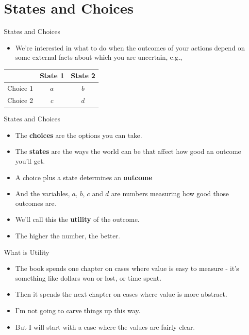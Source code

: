\documentclass[
  ignorenonframetext,
]{beamer}
\providecommand{\tightlist}{%
  \setlength{\itemsep}{0pt}\setlength{\parskip}{0pt}}
\renewcommand{\,}{\text{, }}
\begin{document}
\hypertarget{states-and-choices}{%
\section{States and Choices}\label{states-and-choices}}

\begin{frame}{States and Choices}
\protect\hypertarget{states-and-choices-1}{}

\begin{itemize}
\tightlist
\item
  We're interested in what to do when the outcomes of your actions
  depend on some external facts about which you are uncertain, e.g.,
\end{itemize}

\begin{longtable}[]{@{}rcc@{}}
\toprule
& State 1 & State 2\tabularnewline
\midrule
\endhead
Choice 1 & \(a\) & \(b\)\tabularnewline
Choice 2 & \(c\) & \(d\)\tabularnewline
\bottomrule
\end{longtable}

\end{frame}

\begin{frame}{States and Choices}
\protect\hypertarget{states-and-choices-2}{}

\begin{itemize}
\tightlist
\item
  The \textbf{choices} are the options you can take.
\item
  The \textbf{states} are the ways the world can be that affect how good
  an outcome you'll get.
\item
  A choice plus a state determines an \textbf{outcome}
\item
  And the variables, \(a\), \(b\), \(c\) and \(d\) are numbers measuring
  how good those outcomes are.
\item
  We'll call this the \textbf{utility} of the outcome.
\item
  The higher the number, the better.
\end{itemize}

\end{frame}

\begin{frame}{What is Utility}
\protect\hypertarget{what-is-utility}{}

\begin{itemize}
\tightlist
\item
  The book spends one chapter on cases where value is easy to measure -
  it's something like dollars won or lost, or time spent.
\item
  Then it spends the next chapter on cases where value is more abstract.
\item
  I'm not going to carve things up this way.
\item
  But I will start with a case where the values are fairly clear.
\end{itemize}

\end{frame}
\end{document}
